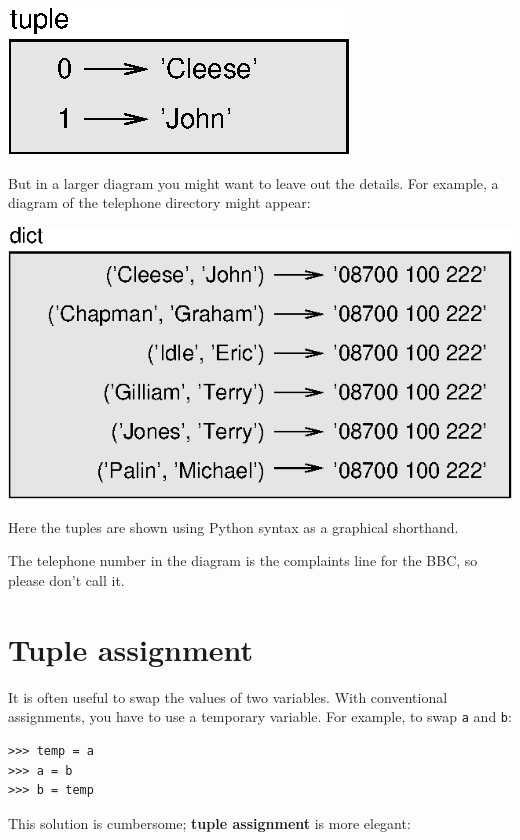 \documentclass[10pt]{book}
\begin{document}
\beforefig
\centerline{\includegraphics{figs/tuple1.eps}}
\afterfig

But in a larger diagram you might want to leave out the
details.  For example, a diagram of the telephone directory might
appear:

\beforefig
\centerline{\includegraphics{figs/dict2.eps}}
\afterfig

Here the tuples are shown using Python syntax as a graphical
shorthand.

The telephone number in the diagram is the complaints line for the
BBC, so please don't call it.




\section{Tuple assignment}
\label{tuple assignment}


It is often useful to swap the values of two variables.
With conventional assignments, you have to use a temporary
variable.  For example, to swap {\tt a} and {\tt b}:

\beforeverb
\begin{verbatim}
>>> temp = a
>>> a = b
>>> b = temp
\end{verbatim}
\afterverb
%
This solution is cumbersome; {\bf tuple assignment} is more elegant:
\end{document}
